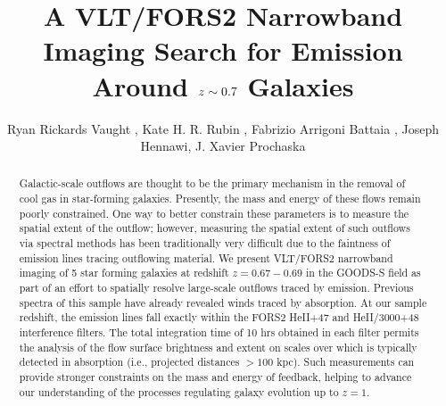 \documentclass[twocolumn]{aastex6}
\begin{document}
\title{A VLT/FORS2 Narrowband Imaging Search for  Emission Around $\lowercase{z}\sim0.7$ Galaxies }
\author{Ryan Rickards Vaught , Kate H. R. Rubin , Fabrizio Arrigoni Battaia ,  Joseph Hennawi, J. Xavier Prochaska}


\begin{abstract}
Galactic-scale outflows are thought to be the primary mechanism in the removal of cool gas in star-forming galaxies. 
%
Presently, the mass and energy of these flows remain poorly constrained.
%
One way to better constrain these parameters is to measure the spatial extent of the outflow; however, measuring the spatial extent of such outflows via spectral methods has been traditionally very difficult due to the faintness of emission lines tracing outflowing material. 
%
We present VLT/FORS2 narrowband imaging of 5 star forming galaxies at redshift $z=0.67-0.69$ in the GOODS-S field as part of an effort to spatially resolve large-scale outflows traced by  emission. 
%
Previous spectra of this sample have already revealed winds traced by  absorption. 
%
At our sample redshift, the  emission lines fall exactly within the FORS2 HeII+47 and HeII/3000+48 interference filters.
%
The total integration time of 10 hrs obtained in each filter permits the analysis of the flow surface brightness and extent on scales over which  is typically detected in absorption (i.e., projected distances $> 100$ kpc). 
%
Such measurements can provide stronger constraints on the mass and energy of feedback, helping to advance our understanding of the processes regulating galaxy evolution up to $z=1$. 
\end{abstract}

\maketitle
\end{document}
